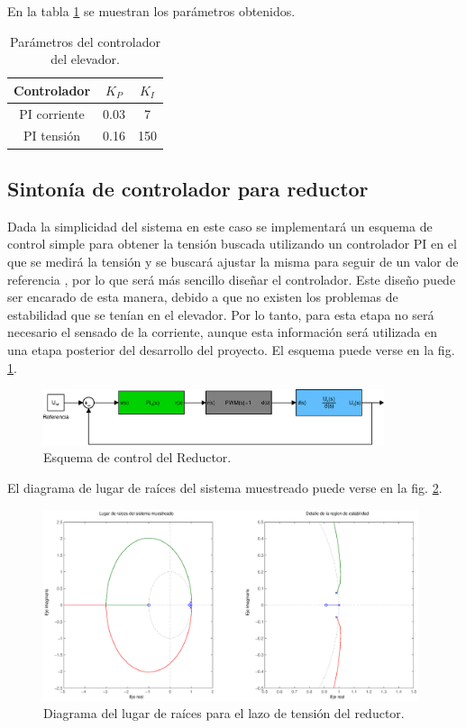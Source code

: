 En la tabla \ref{tab:parametros_control_elevador} se muestran los parámetros obtenidos.

\begin{table}[H]
  \centering
  \begin{tabular}{|c|c|c|}
    \hline 
    Controlador 	& $K_{P}$ 	& $K_{I}$	\tabularnewline \hline \hline 
    PI corriente 	& 0.03 		& 7		\tabularnewline \hline 
    PI tensión 		& 0.16 		& 150		\tabularnewline \hline 
    \end{tabular}
    \caption{Parámetros del controlador del elevador.}
    \label{tab:parametros_control_elevador}
\end{table}

\subsection{Sintonía de controlador para reductor}
Dada la simplicidad del sistema en este caso se implementará un esquema de control simple para obtener la tensión buscada utilizando un controlador
PI en el que se medirá la tensión y se buscará ajustar la misma para seguir de un valor de referencia , por lo que será más sencillo diseñar
el controlador. Este diseño puede ser encarado de esta manera, debido a que no existen los problemas de estabilidad que se tenían en el
elevador. Por lo tanto, para esta etapa no será necesario el sensado de la corriente, aunque esta información será utilizada en una etapa
posterior del desarrollo del proyecto. El esquema puede verse en la fig. \ref{fig:esquema_control_reductor_lineal}.

\begin{figure}[H]
  \centering
  \includegraphics[width=10cm]{gfx/esquema_control_reductor_lineal.eps}
  \caption{Esquema de control del Reductor.}
  \label{fig:esquema_control_reductor_lineal}
\end{figure}

El diagrama de lugar de raíces del sistema muestreado puede verse
en la fig. \ref{fig:rlocus_reductor}.

\begin{figure}[H]
  \centering
  \includegraphics[width=11cm]{gfx/rlocus_reductor.eps}
  \caption{Diagrama del lugar de raíces para el lazo de tensión del reductor.}
  \label{fig:rlocus_reductor}
\end{figure}

